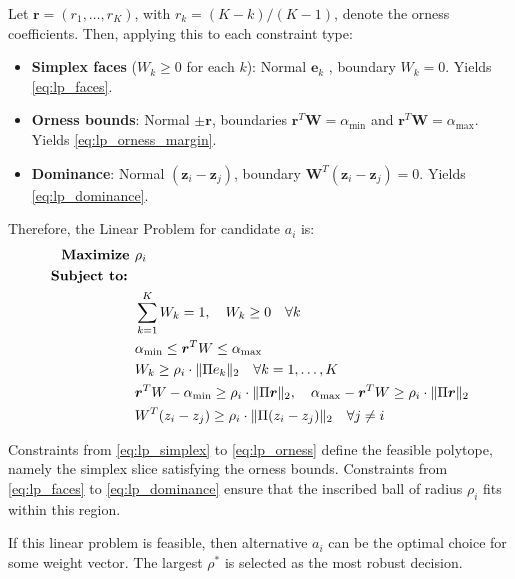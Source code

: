 Let $\boldsymbol{ r }=( r _1,\dots, r _K)$, with $ r _k = (K-k)/(K-1)$, denote the orness coefficients. Then, applying this to each constraint type:
\begin{itemize}
    \item \textbf{Simplex faces} ($W_k \ge 0$ for each $k$): Normal $\mathbf{e}_k$ , boundary $W_k = 0$. Yields \eqref{eq:lp_faces}.
    \item \textbf{Orness bounds}: Normal $\pm\boldsymbol{ r }$, boundaries $\boldsymbol{ r }^T \mathbf{W} = \alpha_{\min}$ and $\boldsymbol{ r }^T \mathbf{W} = \alpha_{\max}$. Yields \eqref{eq:lp_orness_margin}.
    \item \textbf{Dominance}: Normal $(\mathbf{z}_i - \mathbf{z}_j)$, boundary $\mathbf{W}^T(\mathbf{z}_i - \mathbf{z}_j) = 0$. Yields \eqref{eq:lp_dominance}.
\end{itemize}

Therefore, the Linear Problem for candidate $a_i$ is:
\begin{align}
    \textbf{Maximize } & \rho_i \label{eq:lp_objective}\\
    \textbf{Subject to: } & \notag \\
    & \sum_{k=1}^K W_k = 1, \quad W_k \ge 0 \quad \forall k \label{eq:lp_simplex}\\
    & \alpha_{\min} \le \boldsymbol{ r }^T \mathbf{W} \le \alpha_{\max} \label{eq:lp_orness}\\
    & W_k \ge \rho_i \cdot \|\Pi \mathbf{e}_k\|_2 \quad \forall k=1,\dots,K \label{eq:lp_faces}\\
    & \boldsymbol{ r }^T \mathbf{W} - \alpha_{\min} \ge \rho_i \cdot \|\Pi\boldsymbol{ r }\|_2, \quad \alpha_{\max} - \boldsymbol{ r }^T \mathbf{W} \ge \rho_i \cdot \|\Pi\boldsymbol{ r }\|_2 \label{eq:lp_orness_margin}\\
    & \mathbf{W}^T(\mathbf{z}_i - \mathbf{z}_j) \ge \rho_i \cdot \|\Pi (\mathbf{z}_i - \mathbf{z}_j)\|_2 \quad \forall j \neq i \label{eq:lp_dominance}
\end{align}

Constraints from \eqref{eq:lp_simplex} to \eqref{eq:lp_orness} define the feasible polytope, namely the simplex slice satisfying the orness bounds. Constraints from \eqref{eq:lp_faces} to \eqref{eq:lp_dominance} ensure that the inscribed ball of radius $\rho_i$ fits within this region.

If this linear problem is feasible, then alternative $a_i$ can be the optimal choice for some weight vector. The largest $\rho^*$ is selected as the most robust decision.
